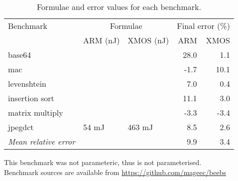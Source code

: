 \documentclass[9pt,preprint]{sigplanconf}
\begin{document}
\begin{table*}
  \centering
  \begin{tabular}{lllrr}
  \toprule
  Benchmark\hspace{-1mm} & \multicolumn{2}{c}{Formulae} & \multicolumn{2}{c}{Final error (\%)} \\
                  & ARM (nJ) &XMOS (nJ) &  ARM & XMOS \\
  \midrule
  base64          &  &    & 28.0                                    & 1.1                                   \\
  mac             &                                                 &                                                    & -1.7                                    & 10.1                                  \\
  levenshtein     &                                          &
                           & 7.0                                     & 0.4                                   \\
  insertion sort  &                                        &                                              & 11.1                                    & 3.0                                   \\
  matrix multiply &                                 &                                     & -3.3                                    & -3.4                                  \\
  jpegdct         & 54 mJ\hspace{-1mm}                   & 463 mJ\hspace{-1mm}                     & 8.5                                     & 2.6                                   \\
  \midrule
  \textit{Mean relative error} & && 9.9 & 3.4 \\
  \bottomrule
  \end{tabular}
  \nocaptionrule
  \caption{Formulae and error values for each benchmark.}
  \vspace{2mm}
   This benchmark was not parameteric, thus is not parameterised. \\
  \raggedleft \small\hspace{-1mm} Benchmark sources are available
  from \url{https://github.com/mageec/beebs}\\
  \label{tab:table_results}
  \vspace{-1em}
\end{table*}
\end{document}

